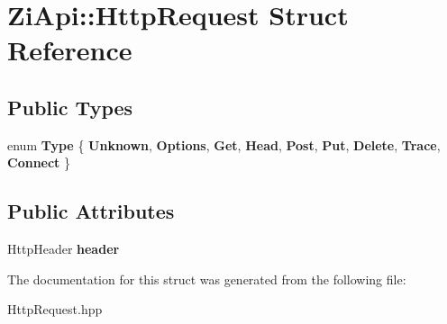 \hypertarget{structZiApi_1_1HttpRequest}{}\section{Zi\+Api\+::Http\+Request Struct Reference}
\label{structZiApi_1_1HttpRequest}
\subsection*{Public Types}
\begin{DoxyCompactItemize}
\item 
\mbox{\label{structZiApi_1_1HttpRequest_aff2444b7a152e8e1038cd84ce67e7238}} 
enum {\bfseries Type} \{ \newline
{\bfseries Unknown}, 
{\bfseries Options}, 
{\bfseries Get}, 
{\bfseries Head}, 
\newline
{\bfseries Post}, 
{\bfseries Put}, 
{\bfseries Delete}, 
{\bfseries Trace}, 
\newline
{\bfseries Connect}
 \}
\end{DoxyCompactItemize}
\subsection*{Public Attributes}
\begin{DoxyCompactItemize}
\item 
\mbox{\label{structZiApi_1_1HttpRequest_acfc8377e4549921b49f68f3c2f05bc03}} 
Http\+Header {\bfseries header}
\end{DoxyCompactItemize}


The documentation for this struct was generated from the following file\+:\begin{DoxyCompactItemize}
\item 
Http\+Request.\+hpp\end{DoxyCompactItemize}
